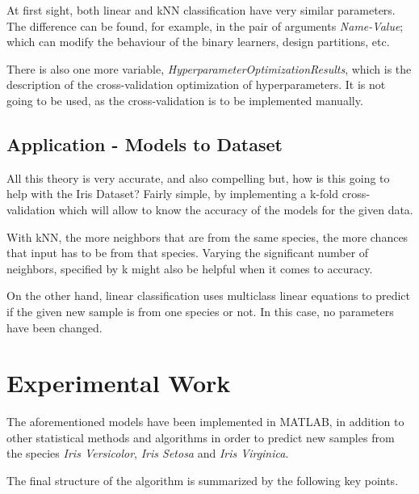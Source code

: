 \documentclass[11pt]{article}
\begin{document}
At first sight, both linear and kNN classification have very similar parameters.
The difference can be found, for example, in the pair of arguments
\textit{Name-Value}; which can modify the behaviour of the binary learners, 
design partitions, etc.

There is also one more variable, \textit{HyperparameterOptimizationResults},
which is the description of the cross-validation optimization of
hyperparameters. It is not going to be used, as the cross-validation is to be
implemented manually.

\subsection{Application - Models to Dataset}

All this theory is very accurate, and also compelling but, how is this going to
help with the Iris Dataset? Fairly simple, by implementing a k-fold
cross-validation which will allow to know the accuracy of the models for the
given data.

With kNN, the more neighbors that are from the same species, the more chances
that input has to be from that species. Varying the significant number of
neighbors, specified by k might also be helpful when it comes to accuracy.

On the other hand, linear classification uses multiclass linear equations to
predict if the given new sample is from one species or not. In this case, no
parameters have been changed.

\section{Experimental Work}

The aforementioned models have been implemented in MATLAB, in addition to other
statistical methods and algorithms in order to predict new samples from the
species \textit{Iris Versicolor}, \textit{Iris Setosa} and \textit{Iris
Virginica}.

The final structure of the algorithm is summarized by the following key points.
\end{document}
